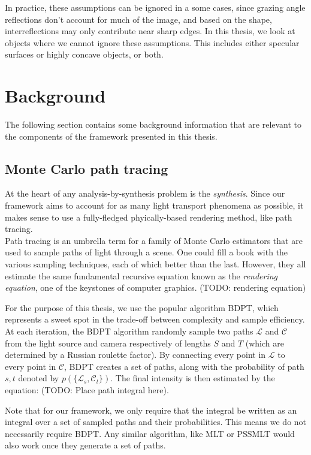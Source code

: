 In practice, these assumptions can be ignored in a some cases, since grazing angle reflections don't account for much of the image, and based on the shape, interreflections may only contribute near sharp edges. In this thesis, we look at objects where we cannot ignore these assumptions. This includes either specular surfaces or highly concave objects, or both.

\section{Background}
The following section contains some background information that are relevant to the components of the framework presented in this thesis.
\subsection{Monte Carlo path tracing}
At the heart of any analysis-by-synthesis problem is the \textit{synthesis}. Since our framework aims to account for as many light transport phenomena as possible, it makes sense to use a fully-fledged phyically-based rendering method, like path tracing. \\
Path tracing is an umbrella term for a family of Monte Carlo estimators that are used to sample paths of light through a scene. One could fill a book with the various sampling techniques, each of which better than the last. However, they all estimate the same fundamental recursive equation known as the \textit{rendering equation}, one of the keystones of computer graphics.
(TODO: rendering equation)

For the purpose of this thesis, we use the popular algorithm BDPT, which represents a sweet spot in the trade-off between complexity and sample efficiency. 
At each iteration, the BDPT algorithm randomly sample two paths $\mathcal{L}$ and $\mathcal{C}$ from the light source and camera respectively of lengths $S$ and $T$ (which are determined by a Russian roulette factor). By connecting every point in $\mathcal{L}$ to every point in $\mathcal{C}$, BDPT creates a set of paths, along with the probability of path $s,t$ denoted by $p(\{\mathcal{L}_s,\mathcal{C}_t\})$.
The final intensity is then estimated by the equation:
(TODO: Place path integral here).

Note that for our framework, we only require that the integral be written as an integral over a set of sampled paths and their probabilities. This means we do not necessarily require BDPT. Any similar algorithm, like MLT or PSSMLT would also work once they generate a set of paths.


